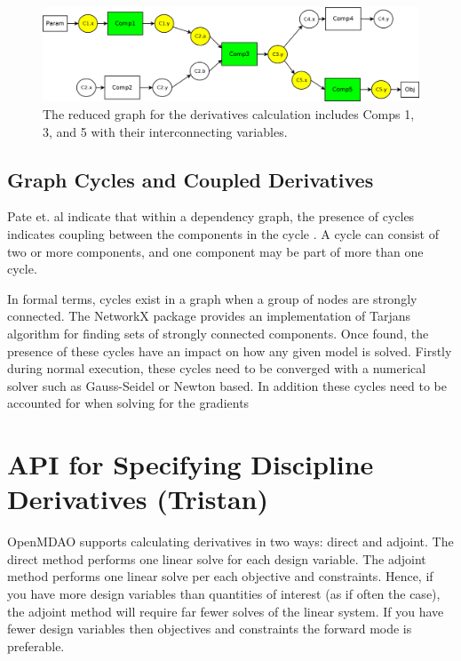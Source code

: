 \documentclass[]{aiaa-tc} %
\begin{document}
        \begin{figure}[!htb]\begin{center}
          \includegraphics[width=.8\textwidth]{images/Graph2}
          \caption{ The reduced graph for the derivatives calculation includes Comps 1, 3, and 5 with their interconnecting variables. \label{fig:graph2}}
        \end{center}\end{figure}

    
    \subsection{Graph Cycles and Coupled Derivatives}

        Pate et. al indicate that within a dependency graph, the presence of cycles indicates coupling between
        the components in the cycle \cite{graph_problem2013}. A cycle can consist of two or more components, and
        one component may be part of more than one cycle.

        In formal terms, cycles exist in a graph when a group of nodes are strongly connected. The NetworkX package
        provides an implementation of Tarjans algorithm for finding sets of strongly connected
        components\cite{tarjan1972depth,nuutila1994finding}. Once found, the presence of these cycles
        have an impact on how any given model is solved. Firstly during normal execution, these cycles
        need to be converged with a numerical solver such as Gauss-Seidel or Newton based.
        In addition these cycles need to be accounted for when solving for the gradients

   
    \section{API for Specifying Discipline Derivatives (Tristan)}

        OpenMDAO supports calculating derivatives in two ways: direct and adjoint. The direct method performs
        one linear solve for each design variable. The adjoint method performs one linear solve per each objective
        and constraints. Hence, if you have more design variables than quantities of interest (as if often the case),
        the adjoint method will require far fewer solves of the linear system. If you have fewer design variables then
        objectives and constraints the forward mode is preferable.
\end{document}
